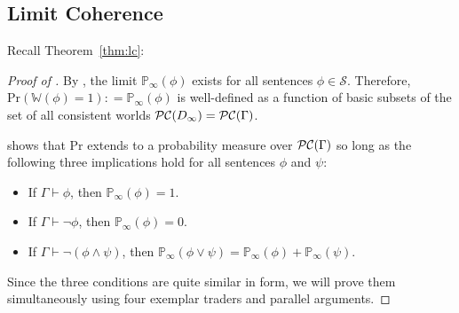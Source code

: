 \documentclass[authordate,onecolumn,noenvironments]{miri-tech-article}
\numberwithin{equation}{subsection}
\newcommand{\Bayesian}{\mathrm{Pr}}
\newcommand{\BelState}{\mathbb{P}}
\newcommand{\pt}{\BelState}
\newcommand{\dt}{D}
\newcommand{\pcworlds}{\mathcal{P\-C}}
\newcommand{\cworlds}{\mathcal{P\-C}} %
\newcommand{\World}{\mathbb{W}}
\newcommand{\Theory}{\Gamma}
\newcommand{\Sentences}{\mathcal{S}}
\begin{document}


  

\subsection{Limit Coherence}\label{sec:limitcoherence}
Recall Theorem~\ref{thm:lc}:

\limitcoherence*

\begin{proof}[Proof of ]
  By , the limit $\pt_\infty(\phi)$ exists for all sentences $\phi\in\Sentences$. Therefore, $\Bayesian(\World(\phi)=1): =\pt_\infty(\phi)$ is well-defined as a function of basic subsets of the set of all consistent worlds $\pcworlds(\dt_\infty) = \cworlds(\Gamma)$.

  \citet{Gaifman:1964} shows that $\Bayesian$ extends to a probability measure over $\cworlds(\Theory)$ so long as the following three implications hold for all sentences $\phi$ and $\psi$:
  \begin{itemize}
    \item If $\Theory \vdash \phi$, then $\pt_\infty(\phi) = 1$.
    \item If $\Theory \vdash \lnot \phi$, then $\pt_\infty(\phi) = 0$.
    \item If $\Theory \vdash \lnot(\phi \land \psi)$, then $\pt_\infty(\phi \lor \psi) = \pt_\infty(\phi) + \pt_\infty(\psi)$.
  \end{itemize}
  Since the three conditions are quite similar in form, we will prove them simultaneously using four exemplar traders and parallel arguments. 


\end{proof}
\end{document}

